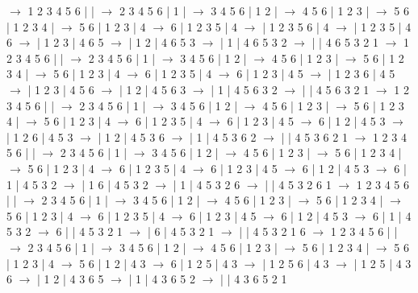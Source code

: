 \documentclass{article}
\begin{document}
\newline
 $\rightarrow$ 1 2 3 4 5 6 |  |  $\rightarrow$ 2 3 4 5 6 | 1 |  $\rightarrow$ 3 4 5 6 | 1 2 |  $\rightarrow$ 4 5 6 | 1 2 3 |  $\rightarrow$ 5 6 | 1 2 3 4 |  $\rightarrow$ 5 6 | 1 2 3 | 4 $\rightarrow$ 6 | 1 2 3 5 | 4 $\rightarrow$  | 1 2 3 5 6 | 4 $\rightarrow$  | 1 2 3 5 | 4 6 $\rightarrow$  | 1 2 3 | 4 6 5 $\rightarrow$  | 1 2 | 4 6 5 3 $\rightarrow$  | 1 | 4 6 5 3 2 $\rightarrow$  |  | 4 6 5 3 2 1
\newline
 $\rightarrow$ 1 2 3 4 5 6 |  |  $\rightarrow$ 2 3 4 5 6 | 1 |  $\rightarrow$ 3 4 5 6 | 1 2 |  $\rightarrow$ 4 5 6 | 1 2 3 |  $\rightarrow$ 5 6 | 1 2 3 4 |  $\rightarrow$ 5 6 | 1 2 3 | 4 $\rightarrow$ 6 | 1 2 3 5 | 4 $\rightarrow$ 6 | 1 2 3 | 4 5 $\rightarrow$  | 1 2 3 6 | 4 5 $\rightarrow$  | 1 2 3 | 4 5 6 $\rightarrow$  | 1 2 | 4 5 6 3 $\rightarrow$  | 1 | 4 5 6 3 2 $\rightarrow$  |  | 4 5 6 3 2 1
\newline
 $\rightarrow$ 1 2 3 4 5 6 |  |  $\rightarrow$ 2 3 4 5 6 | 1 |  $\rightarrow$ 3 4 5 6 | 1 2 |  $\rightarrow$ 4 5 6 | 1 2 3 |  $\rightarrow$ 5 6 | 1 2 3 4 |  $\rightarrow$ 5 6 | 1 2 3 | 4 $\rightarrow$ 6 | 1 2 3 5 | 4 $\rightarrow$ 6 | 1 2 3 | 4 5 $\rightarrow$ 6 | 1 2 | 4 5 3 $\rightarrow$  | 1 2 6 | 4 5 3 $\rightarrow$  | 1 2 | 4 5 3 6 $\rightarrow$  | 1 | 4 5 3 6 2 $\rightarrow$  |  | 4 5 3 6 2 1
\newline
 $\rightarrow$ 1 2 3 4 5 6 |  |  $\rightarrow$ 2 3 4 5 6 | 1 |  $\rightarrow$ 3 4 5 6 | 1 2 |  $\rightarrow$ 4 5 6 | 1 2 3 |  $\rightarrow$ 5 6 | 1 2 3 4 |  $\rightarrow$ 5 6 | 1 2 3 | 4 $\rightarrow$ 6 | 1 2 3 5 | 4 $\rightarrow$ 6 | 1 2 3 | 4 5 $\rightarrow$ 6 | 1 2 | 4 5 3 $\rightarrow$ 6 | 1 | 4 5 3 2 $\rightarrow$  | 1 6 | 4 5 3 2 $\rightarrow$  | 1 | 4 5 3 2 6 $\rightarrow$  |  | 4 5 3 2 6 1
\newline
 $\rightarrow$ 1 2 3 4 5 6 |  |  $\rightarrow$ 2 3 4 5 6 | 1 |  $\rightarrow$ 3 4 5 6 | 1 2 |  $\rightarrow$ 4 5 6 | 1 2 3 |  $\rightarrow$ 5 6 | 1 2 3 4 |  $\rightarrow$ 5 6 | 1 2 3 | 4 $\rightarrow$ 6 | 1 2 3 5 | 4 $\rightarrow$ 6 | 1 2 3 | 4 5 $\rightarrow$ 6 | 1 2 | 4 5 3 $\rightarrow$ 6 | 1 | 4 5 3 2 $\rightarrow$ 6 |  | 4 5 3 2 1 $\rightarrow$  | 6 | 4 5 3 2 1 $\rightarrow$  |  | 4 5 3 2 1 6
\newline
 $\rightarrow$ 1 2 3 4 5 6 |  |  $\rightarrow$ 2 3 4 5 6 | 1 |  $\rightarrow$ 3 4 5 6 | 1 2 |  $\rightarrow$ 4 5 6 | 1 2 3 |  $\rightarrow$ 5 6 | 1 2 3 4 |  $\rightarrow$ 5 6 | 1 2 3 | 4 $\rightarrow$ 5 6 | 1 2 | 4 3 $\rightarrow$ 6 | 1 2 5 | 4 3 $\rightarrow$  | 1 2 5 6 | 4 3 $\rightarrow$  | 1 2 5 | 4 3 6 $\rightarrow$  | 1 2 | 4 3 6 5 $\rightarrow$  | 1 | 4 3 6 5 2 $\rightarrow$  |  | 4 3 6 5 2 1
\end{document}

